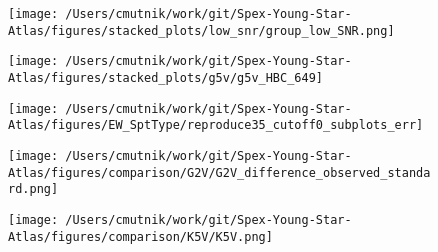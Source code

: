 \begin{figure}[h!]
\begin{center}
\texttt{[image: /Users/cmutnik/work/git/Spex-Young-Star-Atlas/figures/stacked\_plots/low\_snr/group\_low\_SNR.png]}
\caption{ \protect}
\end{center}
\end{figure}


\begin{figure}[h!]
\begin{center}
\texttt{[image: /Users/cmutnik/work/git/Spex-Young-Star-Atlas/figures/stacked\_plots/g5v/g5v\_HBC\_649]}
\caption{ \protect}
\end{center}
\end{figure}




\begin{figure}[h!]
\begin{center}
\texttt{[image: /Users/cmutnik/work/git/Spex-Young-Star-Atlas/figures/EW\_SptType/reproduce35\_cutoff0\_subplots\_err]}
\caption{ \protect}
\end{center}
\end{figure}




\begin{figure}[h!]
\begin{center}
\texttt{[image: /Users/cmutnik/work/git/Spex-Young-Star-Atlas/figures/comparison/G2V/G2V\_difference\_observed\_standard.png]}
\caption{ \protect}
\end{center}
\end{figure}


\begin{figure}[h!]
\begin{center}
\texttt{[image: /Users/cmutnik/work/git/Spex-Young-Star-Atlas/figures/comparison/K5V/K5V.png]}
\caption{ \protect}
\end{center}
\end{figure}




{}


